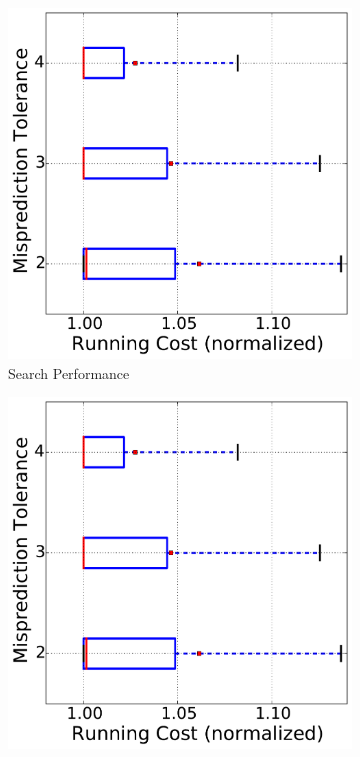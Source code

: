 \begin{figure}[!htbp]
\centering
\begin{subfigure}[b]{0.4\textwidth}
    \includegraphics[width=\linewidth]{figures/single_cost_tuning_tolerance_performance.pdf}
    \caption{Search Performance}
    \label{fig:single_cost_tuning_tolerance_performance}
\end{subfigure}
\begin{subfigure}[b]{0.4\textwidth}
    \includegraphics[width=\linewidth]{figures/single_cost_tuning_tolerance_performance.pdf}

\end{subfigure}
\end{figure}
